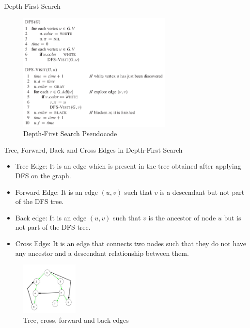 \documentclass[ignorenonframetext,]{beamer}
\providecommand{\tightlist}{%
  \setlength{\itemsep}{0pt}\setlength{\parskip}{0pt}}
\begin{document}
\begin{frame}{Depth-First Search}
\protect\hypertarget{depth-first-search}{}

\begin{figure}
\centering
\includegraphics[width=\textwidth,height=2.34375in]{depth-first-search-pseudocode.png}
\caption{Depth-First Search Pseudocode}
\end{figure}

\end{frame}

\begin{frame}{Tree, Forward, Back and Cross Edges in Depth-First Search}
\protect\hypertarget{tree-forward-back-and-cross-edges-in-depth-first-search}{}

\begin{itemize}
\tightlist
\item
  Tree Edge: It is an edge which is present in the tree obtained after
  applying DFS on the graph.
\item
  Forward Edge: It is an edge \((u, v)\) such that \(v\) is a descendant
  but not part of the DFS tree.
\item
  Back edge: It is an edge \((u, v)\) such that \(v\) is the ancestor of
  node \(u\) but is not part of the DFS tree.
\item
  Cross Edge: It is an edge that connects two nodes such that they do
  not have any ancestor and a descendant relationship between them.
\end{itemize}

\begin{figure}
\centering
\includegraphics[width=\textwidth,height=1.04167in]{tree-forward-back-and-cross-edges.jpg}
\caption{Tree, cross, forward and back edges}
\end{figure}

\end{frame}
\end{document}
